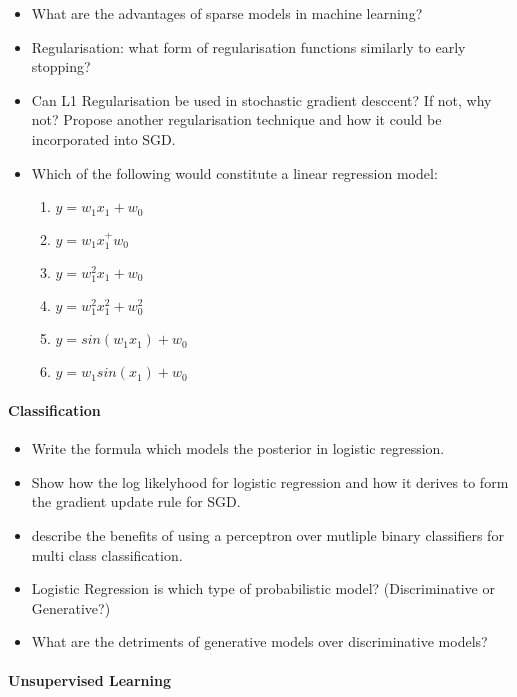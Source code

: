 \documentclass[a4paper]{article}
\begin{document}
    \begin{itemize}
     \item What are the advantages of sparse models in machine learning? 
     \item Regularisation: what form of  regularisation functions similarly to early stopping?
     \item Can L1 Regularisation be used in stochastic gradient desccent? If not, why not? Propose another regularisation technique and how it could be incorporated into SGD.
     \item Which of the following would constitute a linear regression model:
        \begin{enumerate}
         \item $y = w_1x_1 + w_0$
         \item $y = w_1x_1^ + w_0$
         \item $y = w_1^2x_1 + w_0$
         \item $y = w_1^2x_1^2 + w_0^2$
         \item $y = sin(w_1x_1) + w_0$
         \item $y = w_1sin(x_1) + w_0$
        \end{enumerate}

    \end{itemize}
    
    \paragraph{Classification}
    
    \begin{itemize}
     \item Write the formula which models the posterior in logistic regression.
     \item Show how the log likelyhood for logistic regression and how it derives to form the gradient update rule for SGD.
     \item describe the benefits of using a perceptron over mutliple binary classifiers for multi class classification.
     \item Logistic Regression is which type of probabilistic model? (Discriminative or Generative?)
     \item What are the detriments of generative models over discriminative models? 
    \end{itemize}
    
    
    \paragraph{Unsupervised Learning}
    
\end{document}
